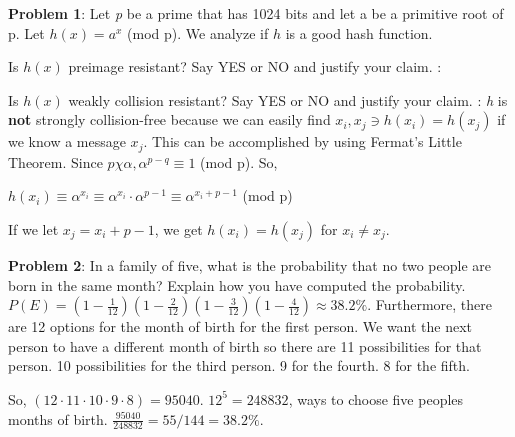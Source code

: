 \documentclass[12pt,letterpaper,final]{report}
\begin{document}

\vline


\bigskip
\noindent\textbf{Problem 1}: Let \textit{p} be a prime that has 1024 bits and let a be a primitive root of p.
\newline Let $h(x) = a^{x}$ (mod p). We analyze if $h$ is a good hash function.
\begin{alphalist}
	\item\indent Is $h(x)$ preimage resistant? Say YES or NO and justify your claim.
	\newline
	:
	\item\indent Is $h(x)$ weakly collision resistant? Say YES or NO and justify your claim.
	\newline
	: \textit{h} is {\bf not} strongly collision-free because we can easily find $x_{i}, x_{j} \ni h(x_{i}) = h(x_{j})$ if we know a message $x_{j}$. This can be accomplished by using Fermat's Little Theorem. Since $p   \chi\alpha, \alpha^{p-q} \equiv 1$ (mod p). So,
\begin{center} 
$h(x_{i}) \equiv \alpha^{{x}_{i} }\equiv \alpha^{{x}_{i}} \cdot \alpha^{p-1} \equiv \alpha^{{x}_{i}+{p-1}}$ (mod p)
\end{center}
If we let $x_{j} = x_{i} + p -1$, we get $h(x_{i}) = h(x_{j})$ for $x_{i} \neq x_{j}$.
\end{alphalist}

\bigskip

\noindent\textbf{Problem 2}: In a family of five, what is the probability that no two people are born in the same month? Explain how you have computed the probability. 
\newline
{} $P(E) = (1 - \frac{1}{12})(1- \frac{2}{12})(1 -\frac{3}{12})(1 - \frac{4}{12}) \approx 38.2\%$. Furthermore, there are 12 options for the month of birth for the first person. We want the next person to have a different month of birth so there are 11 possibilities for that person. 10 possibilities for the third person. 9 for the fourth. 8 for the fifth. 
\begin{center}
So, $(12 \cdot 11 \cdot 10 \cdot 9 \cdot 8) = 95040$. 
$12^{5} = 248832$, ways to choose five peoples months of birth.
$\frac{95040}{248832} = 55/144 = 38.2\%$.
\end{center}
\end{document}
